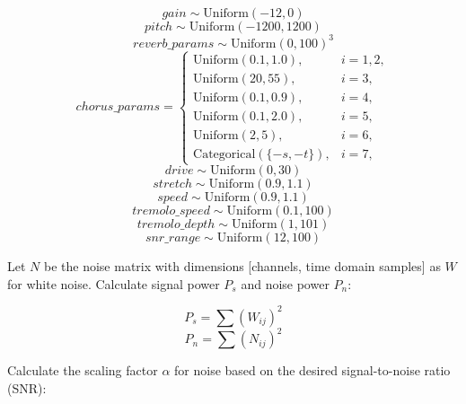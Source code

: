 \begin{equation}
gain \sim \text{Uniform}(-12, 0)
\end{equation}
\begin{equation}
pitch \sim \text{Uniform}(-1200, 1200)
\end{equation}
\begin{equation}
reverb\_params \sim \text{Uniform}(0, 100)^3
\end{equation}
\begin{equation}
chorus\_params = \begin{cases}
\text{Uniform}(0.1, 1.0), & i=1,2, \\
\text{Uniform}(20, 55), & i=3, \\
\text{Uniform}(0.1, 0.9), & i=4, \\
\text{Uniform}(0.1, 2.0), & i=5, \\
\text{Uniform}(2, 5), & i=6, \\
\text{Categorical}(\{-s, -t\}), & i=7,
\end{cases}
\end{equation}
\begin{equation}
drive \sim \text{Uniform}(0, 30)
\end{equation}
\begin{equation}
stretch \sim \text{Uniform}(0.9, 1.1)
\end{equation}
\begin{equation}
speed \sim \text{Uniform}(0.9, 1.1)
\end{equation}
\begin{equation}
tremolo\_speed \sim \text{Uniform}(0.1, 100)
\end{equation}
\begin{equation}
tremolo\_depth \sim \text{Uniform}(1, 101)
\end{equation}
\begin{equation}
snr\_range \sim \text{Uniform}(12, 100)
\end{equation}

Let $N$ be the noise matrix with dimensions [channels, time domain samples] as $W$ for white noise. Calculate signal power $P_s$ and noise power $P_n$:

\begin{equation}
P_s = \sum (W_{ij})^2
\end{equation}
\begin{equation}
P_n = \sum (N_{ij})^2
\end{equation}

Calculate the scaling factor $\alpha$ for noise based on the desired signal-to-noise ratio (SNR):

